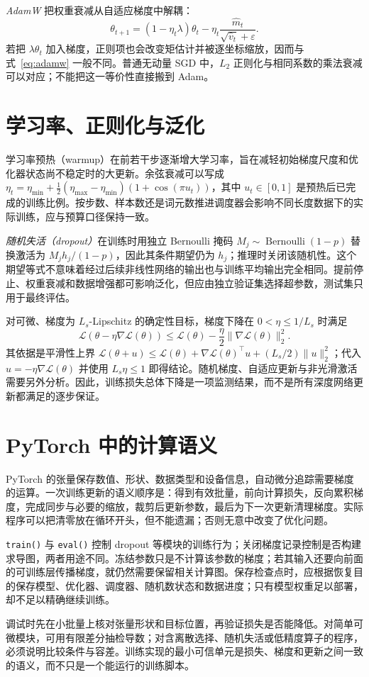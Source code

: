 \emph{AdamW} 把权重衰减从自适应梯度中解耦\cite{adamw}：
\begin{equation}
\theta_{t+1}=(1-\eta_t\lambda)\theta_t
-\eta_t\frac{\widehat m_t}{\sqrt{\widehat v_t}+\varepsilon}.
\label{eq:adamw}
\end{equation}
若把 $\lambda\theta_t$ 加入梯度，正则项也会改变矩估计并被逐坐标缩放，因而与式~\eqref{eq:adamw} 一般不同。普通无动量 SGD 中，$L_2$ 正则化与相同系数的乘法衰减可以对应；不能把这一等价性直接搬到 Adam。

\section{学习率、正则化与泛化}

学习率预热（warmup）在前若干步逐渐增大学习率，旨在减轻初始梯度尺度和优化器状态尚不稳定时的大更新。余弦衰减可以写成 $\eta_t=\eta_{\min}+\tfrac12(\eta_{\max}-\eta_{\min})(1+\cos(\pi u_t))$，其中 $u_t\in[0,1]$ 是预热后已完成的训练比例。按步数、样本数还是词元数推进调度器会影响不同长度数据下的实际训练，应与预算口径保持一致。

\emph{随机失活（dropout）}在训练时用独立 Bernoulli 掩码 $M_j\sim\operatorname{Bernoulli}(1-p)$ 替换激活为 $M_jh_j/(1-p)$，因此其条件期望仍为 $h_j$；推理时关闭该随机性。这个期望等式不意味着经过后续非线性网络的输出也与训练平均输出完全相同。提前停止、权重衰减和数据增强都可影响泛化，但应由独立验证集选择超参数，测试集只用于最终评估。

对可微、梯度为 $L_s$-Lipschitz 的确定性目标，梯度下降在 $0<\eta\le1/L_s$ 时满足
\[
\mathcal L(\theta-\eta\nabla\mathcal L(\theta))
\le\mathcal L(\theta)-\frac\eta2\|\nabla\mathcal L(\theta)\|_2^2.
\]
其依据是平滑性上界 $\mathcal L(\theta+u)\le\mathcal L(\theta)+\nabla\mathcal L(\theta)^\top u+(L_s/2)\|u\|_2^2$；代入 $u=-\eta\nabla\mathcal L(\theta)$ 并使用 $L_s\eta\le1$ 即得结论。随机梯度、自适应更新与非光滑激活需要另外分析。因此，训练损失总体下降是一项监测结果，而不是所有深度网络更新都满足的逐步保证。

\section{PyTorch 中的计算语义}

PyTorch 的张量保存数值、形状、数据类型和设备信息，自动微分追踪需要梯度的运算。一次训练更新的语义顺序是：得到有效批量，前向计算损失，反向累积梯度，完成同步与必要的缩放，裁剪后更新参数，最后为下一次更新清理梯度。实际程序可以把清零放在循环开头，但不能遗漏；否则无意中改变了优化问题。

\texttt{train()} 与 \texttt{eval()} 控制 dropout 等模块的训练行为；关闭梯度记录控制是否构建求导图，两者用途不同。冻结参数只是不计算该参数的梯度；若其输入还要向前面的可训练层传播梯度，就仍然需要保留相关计算图。保存检查点时，应根据恢复目的保存模型、优化器、调度器、随机数状态和数据进度；只有模型权重足以部署，却不足以精确继续训练。

调试时先在小批量上核对张量形状和目标位置，再验证损失是否能降低。对简单可微模块，可用有限差分抽检导数；对含离散选择、随机失活或低精度算子的程序，必须说明比较条件与容差。训练实现的最小可信单元是损失、梯度和更新之间一致的语义，而不只是一个能运行的训练脚本。

